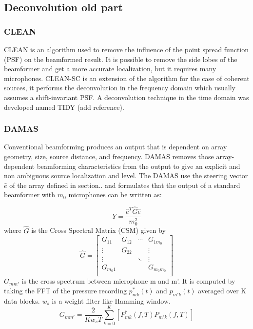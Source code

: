 \subsection{Deconvolution old part}

\subsubsection{CLEAN}

CLEAN is an algorithm used to remove the influence of the point spread function (PSF) on the beamformed result. It is possible to remove the side lobes of the beamformer and get a more accurate localization, but it requires many microphones. CLEAN-SC is an extension of the algorithm for the case of coherent sources, it performs the deconvolution in the frequency domain which usually assumes a shift-invariant PSF. A deconvolution technique in the time domain was developed named TIDY (add reference).

\subsubsection{DAMAS}

Conventional beamforming produces an output that is dependent on array geometry, size, source distance, and frequency. DAMAS removes those array-dependent beamforming characteristics from the output to give an explicit and non ambiguous source localization and level. The DAMAS use the steering vector $\hat{e}$ of the array defined in section.. and formulates that the output of a standard beamformer with $m_{0}$ microphones can be written as:

\begin{equation}
    Y=\frac{\hat{e}^{T}\hat{G}\hat{e}}{m_0^2}
    \label{eq:DAMASoutputbeamformer}
\end{equation}
where $\hat{G}$ is the Cross Spectral Matrix (CSM) given by
\begin{equation}
\hat{G}=
    \begin{bmatrix} 
      G_{11} & G_{12} & \cdots & G_{1m_{0}}\\
      \vdots &  G_{22} &       &  \vdots\\
      \vdots &         & \ddots &  \vdots\\
      G_{m_{0}1} &     &       &  G_{m_{0}m_{0}}\\
    \end{bmatrix}  
\end{equation}
$G_{mm'}$ is the cross spectrum between microphone m  and m'. It is computed by taking the FFT of the pressure recording $p^{*}_{mk}(t)$ and $p_{m'k}(t)$ averaged over K data blocks. $w_{s}$ is a weight filter like Hamming window.
\begin{equation}
    G_{mm'}=\frac{2}{Kw_{s}T}\sum\limits_{k=0}^{K}[P^{*}_{mk}(f,T)P_{m'k}(f,T)]
\end{equation}

